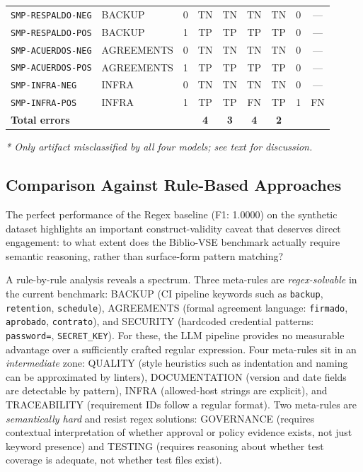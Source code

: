 \documentclass{ieeeaccess}
\begin{document}
\begin{table}[htbp]
{\begin{tabular}{|l|l|c|c|c|c|c|c|c|}
\texttt{SMP-RESPALDO-NEG}    & BACKUP    & 0 & TN & TN & TN & TN & 0 & --- \\
\texttt{SMP-RESPALDO-POS}    & BACKUP    & 1 & TP & TP & TP & TP & 0 & --- \\
\texttt{SMP-ACUERDOS-NEG}    & AGREEMENTS    & 0 & TN & TN & TN & TN & 0 & --- \\
\texttt{SMP-ACUERDOS-POS}    & AGREEMENTS    & 1 & TP & TP & TP & TP & 0 & --- \\
\texttt{SMP-INFRA-NEG}       & INFRA       & 0 & TN & TN & TN & TN & 0 & --- \\
\texttt{SMP-INFRA-POS}       & INFRA       & 1 & TP & TP & \cellcolor{orange!30}FN & TP & 1 & FN \\
\hline
\multicolumn{3}{|l|}{\textbf{Total errors}} & \textbf{4} & \textbf{3} & \textbf{4} & \textbf{2} & & \\
\hline
\end{tabular}
}
\end{table}
\textit{* Only artifact misclassified by all four models; see text for discussion.}

\FloatBarrier

\subsection{Comparison Against Rule-Based Approaches}

The perfect performance of the Regex baseline (F1: 1.0000) on the synthetic dataset highlights an important construct-validity caveat that deserves direct engagement: to what extent does the Biblio-VSE benchmark actually require semantic reasoning, rather than surface-form pattern matching?

A rule-by-rule analysis reveals a spectrum. Three meta-rules are \emph{regex-solvable} in the current benchmark: BACKUP (CI pipeline keywords such as \texttt{backup}, \texttt{retention}, \texttt{schedule}), AGREEMENTS (formal agreement language: \texttt{firmado}, \texttt{aprobado}, \texttt{contrato}), and SECURITY (hardcoded credential patterns: \texttt{password=}, \texttt{SECRET\_KEY}). For these, the LLM pipeline provides no measurable advantage over a sufficiently crafted regular expression. Four meta-rules sit in an \emph{intermediate} zone: QUALITY (style heuristics such as indentation and naming can be approximated by linters), DOCUMENTATION (version and date fields are detectable by pattern), INFRA (allowed-host strings are explicit), and TRACEABILITY (requirement IDs follow a regular format). Two meta-rules are \emph{semantically hard} and resist regex solutions: GOVERNANCE (requires contextual interpretation of whether approval or policy evidence exists, not just keyword presence) and TESTING (requires reasoning about whether test coverage is adequate, not whether test files exist).
\end{document}
